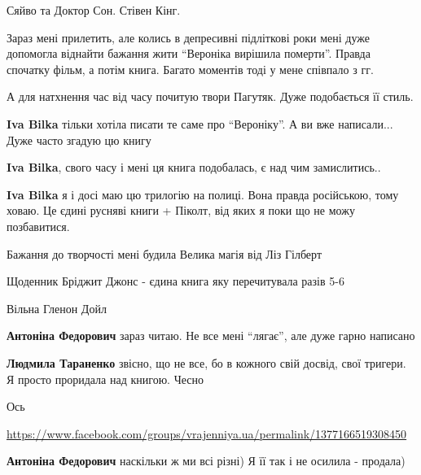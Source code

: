 
Сяйво та Доктор Сон. Стівен Кінг.


Зараз мені прилетить, але колись в депресивні підліткові роки мені дуже
допомогла віднайти бажання жити \enquote{Вероніка вирішила померти}. Правда спочатку
фільм, а потім книга. Багато моментів тоді у мене співпало з гг.

А для натхнення час від часу почитую твори Пагутяк. Дуже подобається її стиль.

\begin{itemize} %
\textbf{Iva Bilka} тільки хотіла писати те саме про \enquote{Вероніку}. А ви вже написали...
Дуже часто згадую цю книгу

\textbf{Iva Bilka}, свого часу і мені ця книга подобалась, є над чим замислитись..

\textbf{Iva Bilka} я і досі маю цю трилогію на полиці. Вона правда російською, тому ховаю. Це єдині русняві книги + Піколт, від яких я поки що не можу позбавитися.
\end{itemize} %


Бажання до творчості мені будила Велика магія від Ліз Гілберт


Щоденник Бріджит Джонс - єдина книга яку перечитувала разів 5-6


Вільна Гленон Дойл

\begin{itemize} %
\textbf{Антоніна Федорович} зараз читаю. Не все мені \enquote{лягає}, але дуже гарно написано

\textbf{Людмила Тараненко} звісно, що не все, бо в кожного свій досвід, свої тригери.
Я просто проридала над книгою. Чесно


Ось

\url{https://www.facebook.com/groups/vrajenniya.ua/permalink/1377166519308450}

\textbf{Антоніна Федорович} наскільки ж ми всі різні) Я її так і не осилила - продала)
\end{itemize} %


